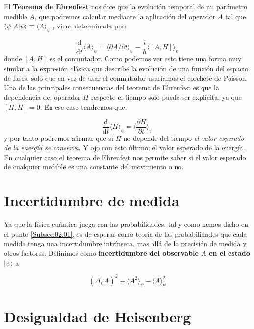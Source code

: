 \documentclass[12pt,a4paper]{book}
\numberwithin{equation}{chapter}
\numberwithin{figure}{chapter}
\newcommand{\parciales}[2]{\frac{\partial #1}{\partial #2}}
\newcommand{\D}{\mathrm{d}}
\newcommand{\derivadas}[2]{\frac{\D #1}{\D #2}}
\begin{document}
El \textbf{Teorema de Ehrenfest} nos dice que la evolución temporal de un parámetro medible $A$, que podremos calcular mediante la aplicación del operador $A$ tal que $\langle \psi | A | \psi \rangle \equiv \langle A \rangle_\psi$ , viene determinada por:

\begin{equation}
\derivadas{}{t} \langle A \rangle_\psi = \langle \partial A / \partial t \rangle_\psi - \frac{i}{\hbar} \langle [A,H] \rangle_\psi \label{Ec:02.03-01}
\end{equation}
donde $[A,H]$ es el conmutador. Como podemos ver esto tiene una forma muy similar a la expresión clásica que describe la evolución de una función del espacio de fases, solo que en vez de usar el conmutador usaríamos el corchete de Poisson. Una de las principales consecuencias del teorema de Ehrenfest es que la dependencia del operador $H$ respecto el tiempo solo puede ser explícita, ya que $[H,H] = 0$. En ese caso tendremos que:

\begin{equation}
\derivadas{}{t} \langle H \rangle_\psi = \langle \parciales{H}{t} \rangle_\psi
\end{equation}
y por tanto podremos afirmar que si $H$ no depende del tiempo \textit{el valor esperado de la energía se conserva}. Y ojo con esto último: el valor esperado de la energía. En cualquier caso el teorema de Ehrenfest nos permite saber si el valor esperado de cualquier medible es una constante del movimiento o no.

\section{Incertidumbre de medida}

Ya que la física cuántica juega con las probabilidades, tal y como hemos dicho en el punto \ref{Subsec:02.01}, es de esperar como teoría de las probabilidades que cada medida tenga una incertidumbre intrínseca, mas allá de la precisión de medida y otros factores. Definimos como \textbf{incertidumbre del observable $A$ en el estado} $|\psi\rangle$ a

\begin{equation}
(\Delta_\psi A)^2 \equiv \langle A^2 \rangle_\psi - \langle A \rangle^2_\psi
\end{equation}

\section{Desigualdad de Heisenberg}
\end{document}
